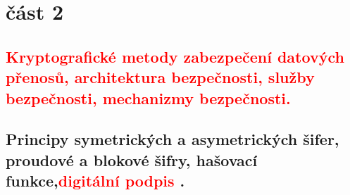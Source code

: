 \section{část 2}
\subsection{\textcolor{red}{Kryptografické metody zabezpečení datových přenosů, architektura bezpečnosti, služby bezpečnosti, mechanizmy bezpečnosti.}}
\subsection{Principy symetrických a asymetrických šifer, proudové a blokové šifry, hašovací funkce,\textcolor{red}{digitální podpis} .}
